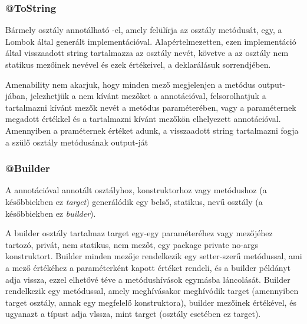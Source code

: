 \subsubsection{@ToString}

Bármely osztály annotálható -el, amely felülírja az osztály  metódusát, egy, a Lombok által generált implementációval. Alapértelmezetten, ezen implementáció által visszaadott string tartalmazza az osztály nevét, követve a az osztály nem statikus mezőinek nevével és ezek értékeivel, a deklarálásuk sorrendjében. \par

Amenability nem akarjuk, hogy minden mező megjelenjen a metódus output-jában, jelezhetjük a nem kívánt mezőket a  annotációval, felsorolhatjuk a tartalmazni kívánt mezők nevét a  metódus  paraméterében, vagy a  paraméternek megadott  értékkel és a tartalmazni kívánt mezőkön elhelyezett  annotációval. Amennyiben a  praméternek  értéket adunk, a visszaadott string tartalmazni fogja a szülő osztály  metódusának output-ját \par

\subsubsection{@Builder}

A  annotációval annotált  osztályhoz, konstruktorhoz vagy metódushoz (a későbbiekben ez \emph{target}) generálódik egy belső, statikus,  nevű osztály (a későbbiekben ez \emph{builder}). \par

A builder osztály tartalmaz target egy-egy paraméteréhez vagy mezőjéhez tartozó, privát, nem statikus, nem  mezőt, egy package private no-args konstruktort. Builder minden mezője rendelkezik egy setter-szerű metódussal, ami a mező értékéhez a paraméterként kapott értéket rendeli, és a builder példányt adja vissza, ezzel elhetővé téve a metódushívások egymásba láncolását. Builder rendelkezik egy  metódussal, amely meghívásakor meghívódik target (amennyiben target osztály, annak egy megfelelő konstruktora), builder mezőinek értékével, és ugyanazt a típust adja vlssza, mint target (osztály esetében ez target). \par

